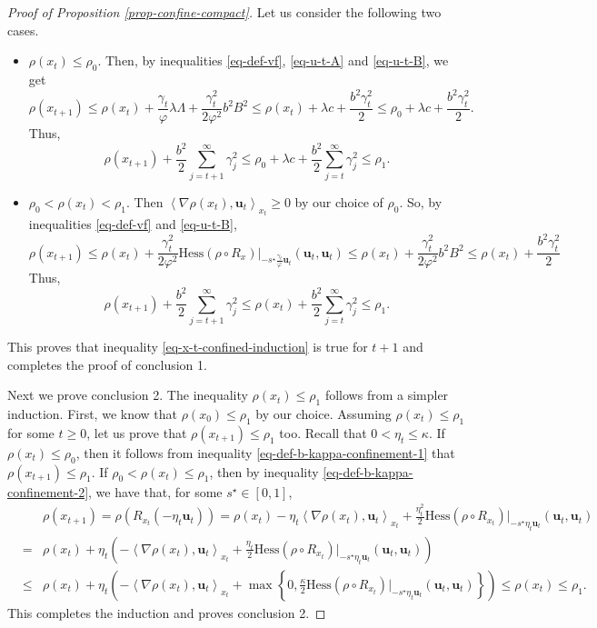\documentclass{amsart}
\newcommand{\vf}{\varphi}
\newcommand{\Hess}{\mathrm{Hess}}
\newcommand{\g}{\gamma}
\theoremstyle{plain}
\theoremstyle{definition}
\theoremstyle{remark}
\numberwithin{theorem}{section}
\numberwithin{equation}{section}
\begin{document}
\begin{proof}[Proof of Proposition \ref{prop-confine-compact}]
Let us consider the following two cases.
\begin{itemize}
	\item[Case 1:] $\rho(x_t)\leq \rho_0$. Then, by inequalities \eqref{eq-def-vf}, \eqref{eq-u-t-A} and \eqref{eq-u-t-B}, we get 
	\[
	\rho(x_{t+1})  \leq   \rho (x_t) + \frac{\g_t}{\vf} \lambda \Lambda+ \frac{\g_t^2}{2\vf^2} b^2B^2 \leq \rho (x_t) + \lambda c + \frac{b^2\g_t^2}{2} \leq \rho_0 + \lambda c + \frac{b^2\g_t^2}{2}.
	\]
	Thus, 
	\[
	\rho(x_{t+1}) + \frac{b^2}{2}\sum_{j=t+1}^\infty \g_j^2 \leq \rho_0 + \lambda c + \frac{b^2}{2}\sum_{j=t}^\infty \g_j^2 \leq \rho_1.
	\]
	\item[Case 2:] $\rho_0<\rho(x_t) < \rho_1$. Then $\left\langle  \nabla \rho(x_t), \mathbf{u}_t\right\rangle_{x_t}\geq 0$ by our choice of $\rho_0$. So, by inequalities \eqref{eq-def-vf} and \eqref{eq-u-t-B},  
	\[
	\rho(x_{t+1}) \leq \rho (x_t)+ \frac{\g_t^2}{2\vf^2}\Hess(\rho\circ R_x)|_{-s^\star \frac{\g_t}{\vf}\mathbf{u}_t} (\mathbf{u}_t,\mathbf{u}_t) \leq  \rho (x_t)+ \frac{\g_t^2}{2\vf^2} b^2B^2 \leq \rho (x_t)+ \frac{b^2\g_t^2}{2}
	\]
	Thus, 
	\[
	\rho(x_{t+1}) + \frac{b^2}{2}\sum_{j=t+1}^\infty \g_j^2 \leq \rho(x_t) + \frac{b^2}{2}\sum_{j=t}^\infty \g_j^2 \leq \rho_1.
	\]
\end{itemize}
This proves that inequality \eqref{eq-x-t-confined-induction} is true for $t+1$ and completes the proof of conclusion 1.

Next we prove conclusion 2. The inequality $\rho(x_t) \leq \rho_1$ follows from a simpler induction. First, we know that $\rho(x_0) \leq \rho_1$ by our choice. Assuming $\rho(x_t) \leq \rho_1$ for some $t\geq 0$, let us prove that $\rho(x_{t+1}) \leq \rho_1$ too. Recall that $0< \eta_t \leq \kappa$. If $\rho(x_t) \leq \rho_0$, then it follows from inequality \eqref{eq-def-b-kappa-confinement-1} that $\rho(x_{t+1}) \leq \rho_1$. If $\rho_0<\rho(x_t) \leq \rho_1$, then by inequality \eqref{eq-def-b-kappa-confinement-2}, we have that, for some $s^\star \in [0,1]$,
\begin{eqnarray*}
	&& \rho(x_{t+1}) = \rho (R_{x_t}(-\eta_t\mathbf{u}_t)) = \rho (x_t) - \eta_t\left\langle  \nabla \rho(x_t), \mathbf{u}_t\right\rangle_{x_t}  + \frac{\eta_t^2}{2}\Hess(\rho\circ R_{x_t})|_{-s^\star \eta_t\mathbf{u}_t} (\mathbf{u}_t,\mathbf{u}_t) \\
	& = & \rho (x_t) + \eta_t \left(-\left\langle  \nabla \rho(x_t), \mathbf{u}_t\right\rangle_{x_t} + \frac{\eta_t}{2}\Hess(\rho\circ R_{x_t})|_{-s^\star \eta_t\mathbf{u}_t} (\mathbf{u}_t,\mathbf{u}_t)\right) \\
	& \leq & \rho (x_t) + \eta_t \left(-\left\langle  \nabla \rho(x_t), \mathbf{u}_t\right\rangle_{x_t} + \max\left\{ 0,\frac{\kappa}{2}\Hess(\rho\circ R_{x_t})|_{-s^\star \eta_t\mathbf{u}_t} (\mathbf{u}_t,\mathbf{u}_t)\right\}\right) \leq \rho (x_t) \leq \rho_1.
\end{eqnarray*}
This completes the induction and proves conclusion 2.
\end{proof}
\end{document}
